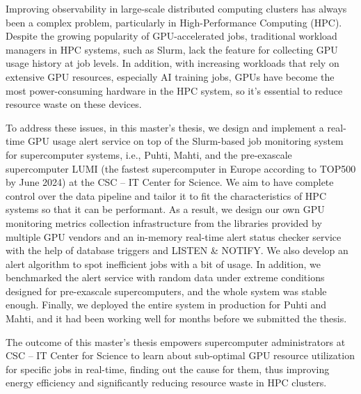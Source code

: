 Improving observability in large-scale distributed computing clusters has always been a complex problem, particularly in High-Performance Computing (HPC). Despite the growing popularity of GPU-accelerated jobs, traditional workload managers in HPC systems, such as Slurm, lack the feature for collecting GPU usage history at job levels. In addition, with increasing workloads that rely on extensive GPU resources, especially AI training jobs, GPUs have become the most power-consuming hardware in the HPC system, so it's essential to reduce resource waste on these devices.

To address these issues, in this master's thesis, we design and implement a real-time GPU usage alert service on top of the Slurm-based job monitoring system for supercomputer systems, i.e., Puhti, Mahti, and the pre-exascale supercomputer LUMI (the fastest supercomputer in Europe according to TOP500 by June 2024) at the CSC -- IT Center for Science. We aim to have complete control over the data pipeline and tailor it to fit the characteristics of HPC systems so that it can be performant. As a result, we design our own GPU monitoring metrics collection infrastructure from the libraries provided by multiple GPU vendors and an in-memory real-time alert status checker service with the help of database triggers and LISTEN \& NOTIFY. We also develop an alert algorithm to spot inefficient jobs with a bit of usage. In addition, we benchmarked the alert service with random data under extreme conditions designed for pre-exascale supercomputers, and the whole system was stable enough. Finally, we deployed the entire system in production for Puhti and Mahti, and it had been working well for months before we submitted the thesis.

The outcome of this master's thesis empowers supercomputer administrators at CSC -- IT Center for Science to learn about sub-optimal GPU resource utilization for specific jobs in real-time, finding out the cause for them, thus improving energy efficiency and significantly reducing resource waste in HPC clusters.
